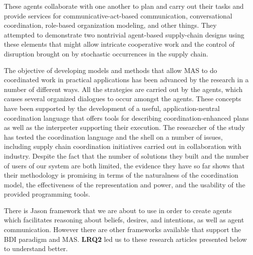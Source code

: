 \begin{itemize}[label={}]
\vspace{.5cm}

These agents collaborate with one another to plan and carry out their tasks and provide services for communicative-act-based communication, conversational coordination, role-based organization modeling, and other things. They attempted to demonstrate two nontrivial agent-based supply-chain designs using these elements that might allow intricate cooperative work and the control of disruption brought on by stochastic occurrences in the supply chain.

\vspace{.5cm}

The objective of developing models and methods that allow \ac{MAS} to do coordinated work in practical applications has been advanced by the research in a number of different ways. All the strategies are carried out by the agents, which causes several organized dialogues to occur amongst the agents. These concepts have been supported by the development of a useful, application-neutral coordination language that offers tools for describing coordination-enhanced plans as well as the interpreter supporting their execution. The researcher of the study has tested the coordination language and the shell on a number of issues, including supply chain coordination initiatives carried out in collaboration with industry. Despite the fact that the number of solutions they built and the number of users of our system are both limited, the evidence they have so far shows that their methodology is promising in terms of the naturalness of the coordination model, the effectiveness of the representation and power, and the usability of the provided programming tools.
\end{itemize}

\vspace{.5cm}

There is Jason framework that we are about to use in order to create agents which facilitates reasoning about beliefs, desires, and intentions, as well as agent communication. However there are other frameworks available that support the \ac{BDI} paradigm and \ac{MAS}. \textbf{LRQ2} led us to these research articles presented below to understand better.

